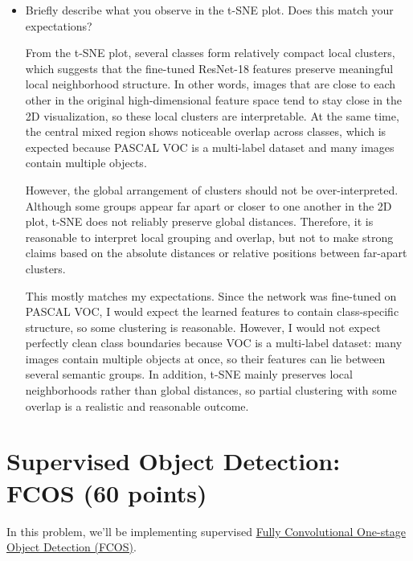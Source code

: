 \documentclass[11pt,addpoints,answers]{exam}
\numberwithin{equation}{section} %
\numberwithin{figure}{section} %
\numberwithin{table}{section} %
\begin{document}
\begin{itemize}
\begin{itemize}
        \item Briefly describe what you observe in the t-SNE plot. Does this match your expectations?

		\begin{solution}
			From the t-SNE plot, several classes form relatively compact local clusters, which suggests that the fine-tuned ResNet-18 features preserve meaningful local neighborhood structure. In other words, images that are close to each other in the original high-dimensional feature space tend to stay close in the 2D visualization, so these local clusters are interpretable. At the same time, the central mixed region shows noticeable overlap across classes, which is expected because PASCAL VOC is a multi-label dataset and many images contain multiple objects.
			
			However, the global arrangement of clusters should not be over-interpreted. Although some groups appear far apart or closer to one another in the 2D plot, t-SNE does not reliably preserve global distances. Therefore, it is reasonable to interpret local grouping and overlap, but not to make strong claims based on the absolute distances or relative positions between far-apart clusters.
			
			This mostly matches my expectations. Since the network was fine-tuned on PASCAL VOC, I would expect the learned features to contain class-specific structure, so some clustering is reasonable. However, I would not expect perfectly clean class boundaries because VOC is a multi-label dataset: many images contain multiple objects at once, so their features can lie between several semantic groups. In addition, t-SNE mainly preserves local neighborhoods rather than global distances, so partial clustering with some overlap is a realistic and reasonable outcome.
		\end{solution}
        
    \end{itemize}
\end{itemize}

\clearpage
\section{Supervised Object Detection: FCOS (60 points)}
In this problem, we'll be implementing supervised {\href{https://arxiv.org/abs/1904.01355}{Fully Convolutional One-stage Object Detection (FCOS)}}. 
\end{document}
